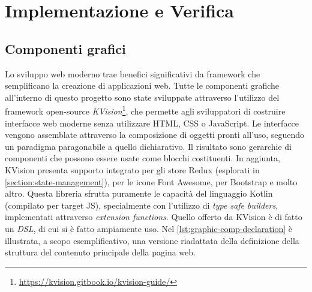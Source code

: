 \chapter{Implementazione e Verifica}

\section{Componenti grafici}
Lo sviluppo web moderno trae benefici significativi da framework che semplificano la creazione di applicazioni web. Tutte le componenti grafiche all'interno di questo progetto sono state sviluppate attraverso l'utilizzo del framework open-source \textit{KVision}\footnote{\url{https://kvision.gitbook.io/kvision-guide/}}, che permette agli sviluppatori di costruire interfacce web moderne senza utilizzare HTML, CSS o JavaScript. Le interfacce vengono assemblate attraverso la composizione di oggetti pronti all'uso, seguendo un paradigma paragonabile a quello dichiarativo. Il risultato sono gerarchie di componenti che possono essere usate come blocchi costituenti. In aggiunta, KVision presenta supporto integrato per gli store Redux (esplorati in \cref{section:state-management}), per le icone Font Awesome, per Bootstrap e molto altro. Questa libreria sfrutta puramente le capacità del linguaggio Kotlin (compilato per target JS), specialmente con l'utilizzo di \textit{type safe builders}, implementati attraverso \textit{extension functions}. Quello offerto da KVision è di fatto un \textit{\ac{DSL}}, di cui si è fatto ampiamente uso.
Nel \cref{lst:graphic-comp-declaration} è illustrata, a scopo esemplificativo, una versione riadattata della definizione della struttura del contenuto principale della pagina web.



